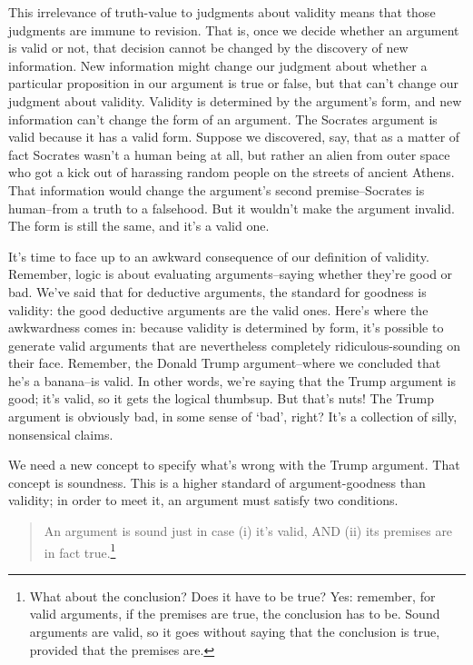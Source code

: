 This irrelevance of truth-value to judgments about validity means that those judgments are immune
to revision. That is, once we decide whether an argument is valid or not, that decision cannot be
changed by the discovery of new information. New information might change our judgment about
whether a particular proposition in our argument is true or false, but that can't change our judgment
about validity. Validity is determined by the argument's form, and new information can't change
the form of an argument. The Socrates argument is valid because it has a valid form. Suppose we
discovered, say, that as a matter of fact Socrates wasn't a human being at all, but rather an alien
from outer space who got a kick out of harassing random people on the streets of ancient Athens.
That information would change the argument's second premise--Socrates is human--from a truth
to a falsehood. But it wouldn't make the argument invalid. The form is still the same, and it's a
valid one.

It's time to face up to an awkward consequence of our definition of validity. Remember, logic is
about evaluating arguments--saying whether they're good or bad. We've said that for deductive
arguments, the standard for goodness is validity: the good deductive arguments are the valid ones.
Here's where the awkwardness comes in: because validity is determined by form, it's possible to
generate valid arguments that are nevertheless completely ridiculous-sounding on their face.
Remember, the Donald Trump argument--where we concluded that he's a banana--is valid. In
other words, we're saying that the Trump argument is good; it's valid, so it gets the logical thumbsup. 
But that's nuts! The Trump argument is obviously bad, in some sense of `bad', right? It's a
collection of silly, nonsensical claims.

We need a new concept to specify what's wrong with the Trump argument. That concept is
soundness. This is a higher standard of argument-goodness than validity; in order to meet it, an
argument must satisfy two conditions.

\begin{quote}
An argument is sound just in case (i) it's valid, AND (ii) its premises are in fact 
true.\footnote{What about the conclusion? Does it have to be true? Yes: remember, for valid arguments, if the premises are true,
the conclusion has to be. Sound arguments are valid, so it goes without saying that the conclusion is true, provided
that the premises are.}
\end{quote}

